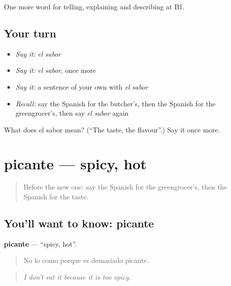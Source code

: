 \begin{grammarlens}[title={What you've built}]
One more word for telling, explaining and describing at B1.
\end{grammarlens}

\subsection*{Your turn}
\begin{itemize}
\raggedright
  \item \emph{Say it:} \emph{el sabor}
  \item \emph{Say it:} \emph{el sabor}, once more
  \item \emph{Say it:} a sentence of your own with \emph{el sabor}
  \item \emph{Recall:} say the Spanish for the butcher's, then the Spanish for the greengrocer's, then say \emph{el sabor} again
\end{itemize}

\begin{tcolorbox}[breakable,colback=teal!4,colframe=teal!35!black,title={Before you move on}]
What does el sabor mean? (\textquotedblleft{}The taste, the flavour\textquotedblright{}.) Say it once more.
\end{tcolorbox}
\section[picante]{picante — spicy, hot}

\label{lesson:ES-C771-picante}



\begin{quote}
Before the new one: say the Spanish for the greengrocer's, then the Spanish for the taste.
\end{quote}

\subsection*{You'll want to know: picante}
\textbf{picante} — \textquotedblleft{}spicy, hot\textquotedblright{}.

\begin{quote}
No lo como porque es demasiado picante.
\end{quote}

\begin{quote}
\emph{I don't eat it because it is too spicy.}
\end{quote}

